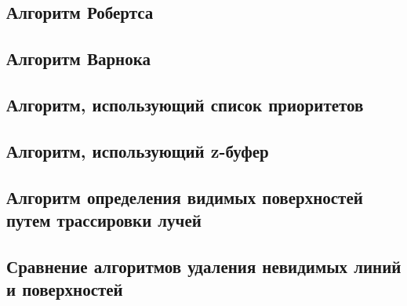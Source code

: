 \subsection{Алгоритм Робертса}

\subsection{Алгоритм Варнока}

\subsection{Алгоритм, использующий список приоритетов}

\subsection{Алгоритм, использующий z-буфер}

\subsection{Алгоритм определения видимых поверхностей путем трассировки лучей}

\subsection{Сравнение алгоритмов удаления невидимых линий и поверхностей}









